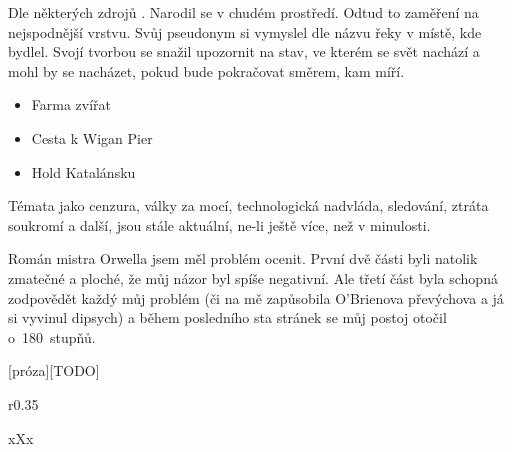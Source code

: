 \documentclass{extarticle} %
\begin{document}
\noindent 
Dle některých zdrojů . Narodil se v chudém prostředí. Odtud to zaměření na nejspodnější vrstvu. Svůj pseudonym si vymyslel dle názvu řeky v místě, kde bydlel. Svojí tvorbou se snažil upozornit na stav, ve kterém se svět nachází a mohl by se nacházet, pokud bude pokračovat směrem, kam míří.


\noindent 
\begin{itemize}
    \item Farma zvířat
    \item Cesta k Wigan Pier
    \item Hold Katalánsku
\end{itemize}




\noindent
Témata jako cenzura, války za mocí, technologická nadvláda, sledování, ztráta soukromí a další, jsou stále aktuální, ne-li ještě více, než v minulosti.


\noindent 
Román mistra Orwella jsem měl problém ocenit. První dvě části byli natolik zmatečné a ploché, že můj názor byl spíše negativní. Ale třetí část byla schopná zodpovědět každý můj problém (či na mě zapůsobila O’Brienova převýchova a já si vyvinul dipsych) a během posledního sta stránek se můj postoj otočil o~180~stupňů.



\vfill


\newpage


\changefontsize{8pt}

[próza][TODO]

\noindent\begin{wrapfigure}{r}{0.35\textwidth}
\tiny

\setlength{\parindent}{3pt}
xXx
\end{wrapfigure}
\end{document}
